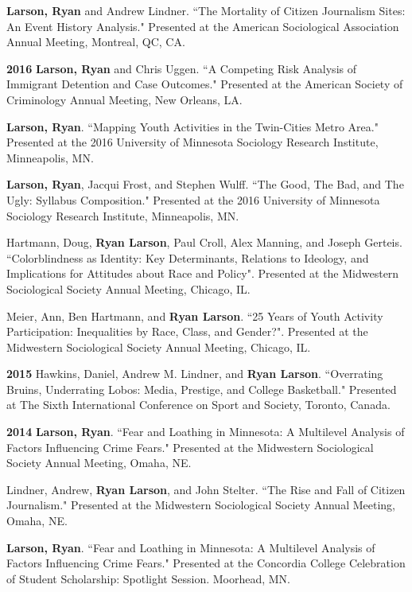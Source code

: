 \documentclass[letterpaper]{article}
\newenvironment{publist}{%
  \begin{list}{}{%
    \setlength{\leftmargin}{0cm}   %
    \setlength{\labelwidth}{2cm}     %
    \setlength{\labelsep}{0.5cm}     %
  }%
}{%
  \end{list}%
}
\begin{document}
\begin{publist}
\item \textbf{Larson, Ryan} and Andrew Lindner. ``The Mortality of Citizen Journalism Sites: An Event History Analysis." Presented at the American Sociological Association Annual Meeting, Montreal, QC, CA.

\item[\textbf{2016}] \textbf{Larson, Ryan} and Chris Uggen. ``A Competing Risk Analysis of Immigrant Detention and Case Outcomes." Presented at the American Society of Criminology Annual Meeting, New Orleans, LA. 

\item \textbf{Larson, Ryan}. ``Mapping Youth Activities in the Twin-Cities Metro Area." Presented at the 2016 University of Minnesota Sociology Research Institute, Minneapolis, MN. 

\item \textbf{Larson, Ryan}, Jacqui Frost, and Stephen Wulff. ``The Good, The Bad, and The Ugly: Syllabus Composition." Presented at the 2016 University of Minnesota Sociology Research Institute, Minneapolis, MN. 

\item Hartmann, Doug, \textbf{Ryan Larson}, Paul Croll, Alex Manning,  and Joseph Gerteis. ``Colorblindness as Identity:  Key Determinants, Relations to Ideology, and Implications for Attitudes about Race and Policy". Presented at the Midwestern Sociological Society Annual Meeting, Chicago, IL. 

\item Meier, Ann, Ben Hartmann, and \textbf{Ryan Larson}. ``25 Years of Youth Activity Participation: Inequalities by Race, Class, and Gender?". Presented at the Midwestern Sociological Society Annual Meeting, Chicago, IL. 

\item[\textbf{2015}] Hawkins, Daniel, Andrew M. Lindner, and \textbf{Ryan Larson}. ``Overrating Bruins, Underrating Lobos: Media, Prestige, and College Basketball." Presented at The Sixth International Conference on Sport and Society, Toronto, Canada.

\item[\textbf{2014}] \textbf{Larson, Ryan}. ``Fear and Loathing in Minnesota: A Multilevel Analysis of Factors Influencing Crime Fears." Presented at the Midwestern Sociological Society Annual Meeting, Omaha, NE.

\item Lindner, Andrew, \textbf{Ryan Larson}, and John Stelter. ``The Rise and Fall of Citizen Journalism." Presented at the Midwestern Sociological Society Annual Meeting, Omaha, NE. 

\item \textbf{Larson, Ryan}. ``Fear and Loathing in Minnesota: A Multilevel Analysis of Factors Influencing Crime Fears." Presented at the Concordia College Celebration of Student Scholarship: Spotlight Session. Moorhead, MN. 


\end{publist}
\end{document}
